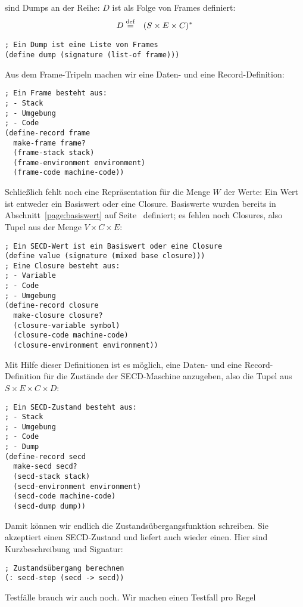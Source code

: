sind Dumps an der Reihe: $D$ ist als Folge von Frames definiert:
%
\begin{eqnarray*}
  D &\stackrel{\rm def}{=}& (S\times E \times C)^\ast
\end{eqnarray*}\vspace*{-5ex}
%
\begin{lstlisting}
; Ein Dump ist eine Liste von Frames
(define dump (signature (list-of frame)))
\end{lstlisting}
%
Aus dem Frame-Tripeln machen wir eine Daten- und eine Record-Definition:
%
\begin{lstlisting}
; Ein Frame besteht aus:
; - Stack
; - Umgebung
; - Code
(define-record frame
  make-frame frame?
  (frame-stack stack)
  (frame-environment environment)
  (frame-code machine-code))
\end{lstlisting}
%
Schließlich fehlt noch eine Repräsentation für die Menge $W$ der
Werte: Ein Wert ist entweder ein Basiswert oder eine Closure.
Basiswerte wurden bereits in Abschnitt~\ref{page:basiswert} auf
Seite~\pageref{page:basiswert} definiert; es fehlen noch
Closures, also Tupel aus der Menge $V\times C\times E$:
%
\begin{lstlisting}
; Ein SECD-Wert ist ein Basiswert oder eine Closure
(define value (signature (mixed base closure)))
; Eine Closure besteht aus:
; - Variable
; - Code
; - Umgebung
(define-record closure
  make-closure closure?
  (closure-variable symbol)
  (closure-code machine-code)
  (closure-environment environment))
\end{lstlisting}
%
Mit Hilfe dieser Definitionen ist es möglich, eine Daten- und eine
Record-Definition für die Zustände der SECD-Maschine anzugeben, also
die Tupel aus $S\times E\times C\times D$:
%
\begin{lstlisting}
; Ein SECD-Zustand besteht aus:
; - Stack
; - Umgebung
; - Code
; - Dump
(define-record secd
  make-secd secd?
  (secd-stack stack)
  (secd-environment environment)
  (secd-code machine-code)
  (secd-dump dump))
\end{lstlisting}
%
Damit können wir endlich die Zustandsübergangsfunktion schreiben.  Sie
akzeptiert einen SECD-Zustand und liefert auch wieder einen.  Hier
sind Kurzbeschreibung und Signatur:
%
\begin{lstlisting}
; Zustandsübergang berechnen
(: secd-step (secd -> secd))
\end{lstlisting}
%
Testfälle brauch wir auch noch.  Wir machen einen Testfall pro Regel
